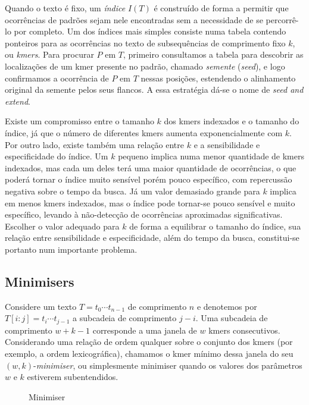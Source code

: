 \documentclass[12pt, a4paper, oneside]{article}
\begin{document}
Quando o texto é fixo, um \emph{índice} $I(T)$ é construído de forma a permitir que ocorrências de padrões sejam nele encontradas sem a necessidade de se percorrê-lo por completo. Um dos índices mais simples consiste numa tabela contendo ponteiros para as ocorrências no texto de subsequências de comprimento fixo $k$, ou \emph{kmers}. Para procurar $P$ em $T$, primeiro consultamos a tabela para descobrir as localizações de um kmer presente no padrão, chamado \emph{semente} (\emph{seed}), e logo confirmamos a ocorrência de $P$ em  $T$ nessas posições, estendendo o alinhamento original da semente pelos seus flancos. A essa estratégia dá-se o nome de \emph{seed and extend}. 

Existe um compromisso entre o tamanho $k$ dos kmers indexados e o tamanho do índice, já que o número de diferentes kmers aumenta exponencialmente com $k$. Por outro lado, existe também uma relação entre $k$ e a sensibilidade e especificidade do índice. Um $k$ pequeno implica numa menor quantidade de kmers indexados, mas cada um deles terá uma maior quantidade de ocorrências, o que poderá tornar o índice muito sensível porém pouco específico, com repercussão negativa sobre o tempo da busca. Já um valor demasiado grande para $k$ implica em menos kmers indexados, mas o índice pode tornar-se pouco sensível e muito específico, levando à não-detecção de ocorrências aproximadas significativas. Escolher o valor adequado para $k$ de forma a equilibrar o tamanho do índice, sua relação entre sensibilidade e especificidade, além do tempo da busca, constitui-se portanto num importante problema.

\subsection{Minimisers}

Considere um texto $T=t_0\cdots t_{n-1}$ de comprimento $n$ e denotemos por $T[i:j]=t_i\cdots t_{j-1}$ a subcadeia de comprimento $j-i$. Uma subcadeia de comprimento $w+k-1$ corresponde a uma janela de $w$\/ kmers consecutivos. Considerando uma relação de ordem qualquer sobre o conjunto dos kmers (por exemplo, a ordem lexicográfica), chamamos o kmer mínimo dessa janela do seu $(w,k)$-\textit{minimiser}, ou simplesmente minimiser quando os valores dos parâmetros $w$ e $k$ estiverem subentendidos.

\begin{figure}[htpb]
	\centering
	\caption{Minimiser}
	\label{fig:name}
\end{figure}
\end{document}
